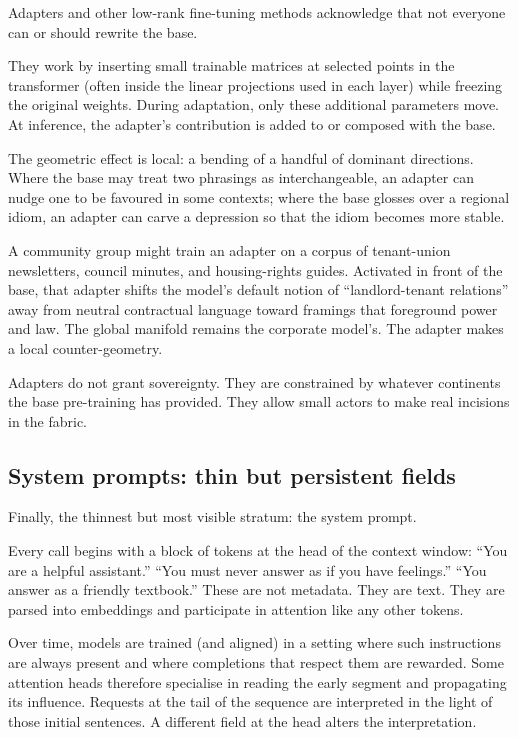 \documentclass[12pt,a4paper]{article}
\begin{document}
Adapters and other low-rank fine-tuning methods acknowledge that not everyone can or should rewrite the base.

They work by inserting small trainable matrices at selected points in the transformer (often inside the linear projections used in each layer) while freezing the original weights. During adaptation, only these additional parameters move. At inference, the adapter's contribution is added to or composed with the base.

The geometric effect is local: a bending of a handful of dominant directions. Where the base may treat two phrasings as interchangeable, an adapter can nudge one to be favoured in some contexts; where the base glosses over a regional idiom, an adapter can carve a depression so that the idiom becomes more stable.

A community group might train an adapter on a corpus of tenant-union newsletters, council minutes, and housing-rights guides. Activated in front of the base, that adapter shifts the model's default notion of ``landlord-tenant relations'' away from neutral contractual language toward framings that foreground power and law. The global manifold remains the corporate model's. The adapter makes a local counter-geometry.

Adapters do not grant sovereignty. They are constrained by whatever continents the base pre-training has provided. They allow small actors to make real incisions in the fabric.

\subsection*{System prompts: thin but persistent fields}

Finally, the thinnest but most visible stratum: the system prompt.

Every call begins with a block of tokens at the head of the context window: ``You are a helpful assistant.'' ``You must never answer as if you have feelings.'' ``You answer as a friendly textbook.'' These are not metadata. They are text. They are parsed into embeddings and participate in attention like any other tokens.

Over time, models are trained (and aligned) in a setting where such instructions are always present and where completions that respect them are rewarded. Some attention heads therefore specialise in reading the early segment and propagating its influence. Requests at the tail of the sequence are interpreted in the light of those initial sentences. A different field at the head alters the interpretation.
\end{document}
